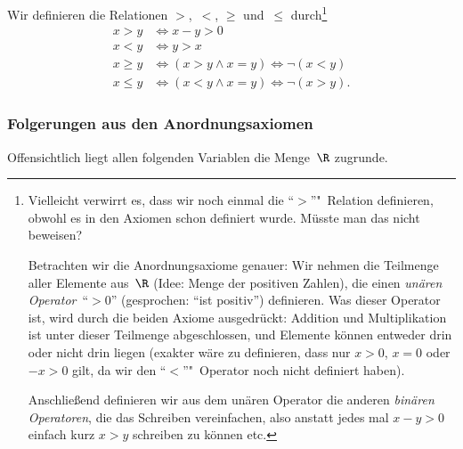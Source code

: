 \documentclass[a4paper]{article}
\begin{document}
\begin{notation}
    Wir definieren die Relationen $>$,~$<$, $\geq$ und~$\leq$ durch\footnote{Vielleicht verwirrt es, dass wir noch einmal die "`$>$"'"~Relation definieren, obwohl es in den Axiomen schon definiert wurde. Müsste man das nicht beweisen?

        Betrachten wir die Anordnungsaxiome genauer: Wir nehmen die Teilmenge aller Elemente aus~$\R$ (Idee: Menge der positiven Zahlen), die einen \emph{unären Operator}~"`$>0$"' (gesprochen: "`ist positiv"') definieren. Was dieser Operator ist, wird durch die beiden Axiome ausgedrückt: Addition und Multiplikation ist unter dieser Teilmenge abgeschlossen, und Elemente können entweder drin oder nicht drin liegen (exakter wäre zu definieren, dass nur $x > 0$, $x = 0$ oder $-x > 0$ gilt, da wir den "`$<$"'"~Operator noch nicht definiert haben).

        Anschließend definieren wir aus dem unären Operator die anderen \emph{binären Operatoren}, die das Schreiben vereinfachen, also anstatt jedes mal $x - y > 0$ einfach kurz $x > y$ schreiben zu können etc.}
    \begin{align*}
        x > y    & \iff x - y > 0                               \\
        x < y    & \iff y > x                                   \\
        x \geq y & \iff (x > y \wedge x = y) \iff \neg (x < y)  \\
        x \leq y & \iff (x < y \wedge x = y) \iff \neg (x > y).
    \end{align*}
\end{notation}

\subsubsection{Folgerungen aus den Anordnungsaxiomen}

Offensichtlich liegt allen folgenden Variablen die Menge~$\R$ zugrunde.
\end{document}
